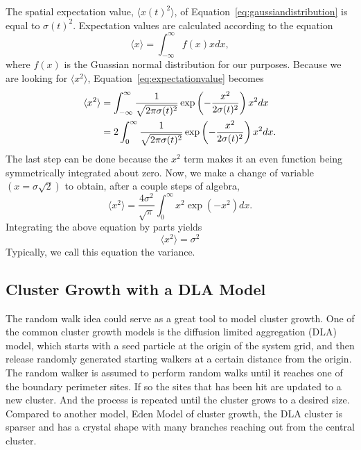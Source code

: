 \documentclass[12pt]{article}
\begin{document}
The spatial expectation value, $\langle x(t)^2\rangle$, of Equation~\ref{eq:gaussiandistribution} is equal to $\sigma(t)^2$. Expectation values are calculated according to the equation
\begin{equation}
  \label{eq:expectationvalue}
  \langle x\rangle = \int_{-\infty}^\infty f(x)xdx,
\end{equation}
where $f(x)$ is the Guassian normal distribution for our purposes. Because we are looking for $\langle x^2\rangle$, Equation~\ref{eq:expectationvalue} becomes
\begin{align}
  \label{eq:spatialexpectationvalueintegral}
  \langle x^2\rangle &= \int_{-\infty}^\infty \frac{1}{\sqrt{2\pi\sigma(t)^2}}\exp\left(-\frac{x^2}{2\sigma(t)^2}\right) x^2 dx \notag \\
  &= 2\int_{0}^\infty \frac{1}{\sqrt{2\pi\sigma(t)^2}}\exp\left(-\frac{x^2}{2\sigma(t)^2}\right) x^2 dx.
\end{align}
The last step can be done because the $x^2$ term makes it an even function being symmetrically integrated about zero. Now, we make a change of variable $(x=\sigma\sqrt{2})$ to obtain, after a couple steps of algebra,
\begin{equation}
  \label{eq:spatialexpectationvalue-simplified}
  \langle x^2\rangle = \frac{4\sigma^2}{\sqrt{\pi}}\int_0^\infty x^2 \exp(-x^2)dx.
\end{equation}
Integrating the above equation by parts yields
\begin{equation}
  \label{eq:variancesolved}
  \langle x^2 \rangle = \sigma^2
\end{equation}
Typically, we call this equation the variance. %

\subsection{Cluster Growth with a DLA Model}
\label{sec:clusterDLAmodel}



The random walk idea could serve as a great tool to model cluster growth. One of the common cluster growth models is the diffusion limited aggregation (DLA) model, which starts with a seed particle at the origin of the system grid, and then release randomly generated starting walkers at a certain distance from the origin. The random walker is assumed to perform random walks until it reaches one of the boundary perimeter sites.  If so the sites that has been hit are updated to a new cluster. And the process is repeated until the cluster grows to a desired size. Compared to another model, Eden Model of cluster growth, the DLA cluster is sparser and has a crystal shape with many branches reaching out from the central cluster.\\
\end{document}

